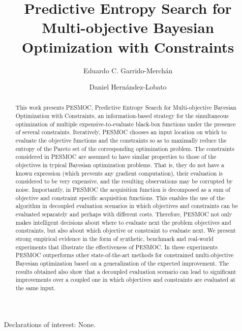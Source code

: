\documentclass[review,preprint,12pt]{elsarticle}
\begin{document}
\begin{frontmatter}

\title{Predictive Entropy Search for Multi-objective Bayesian Optimization with Constraints}

\author{Eduardo C. Garrido-Merch\'an}
\address{Computer Science Department\\
       Universidad Aut\'onoma de Madrid\\
       Francisco Tom\'as y Valiente 11, Madrid, Spain}
\author{Daniel Hern\'andez-Lobato}
\address{Computer Science Department\\
       Universidad Aut\'onoma de Madrid\\
       Francisco Tom\'as y Valiente 11, Madrid, Spain}

\maketitle

Declarations of interest: None.
\begin{abstract}%
This work presents PESMOC, Predictive Entropy
Search for Multi-objective Bayesian Optimization with Constraints,
an information-based strategy for the simultaneous optimization
of multiple expensive-to-evaluate black-box functions
under the presence of several constraints. Iteratively,
PESMOC chooses an input location on which to evaluate the
objective functions and the constraints so as to maximally reduce
the entropy of the Pareto set of the corresponding optimization
problem. The constraints considered in PESMOC are assumed
to have similar properties to those of the objectives in typical 
Bayesian optimization problems. That is, they do not have 
a known expression (which prevents any gradient computation), their 
evaluation is considered to be very expensive, and the resulting 
observations may be corrupted by noise. Importantly, in PESMOC 
the acquisition function is decomposed as a sum of 
objective and constraint specific acquisition functions.
This enables the use of the algorithm in decoupled evaluation 
scenarios in which objectives and constraints can be evaluated 
separately and perhaps with different costs. Therefore, PESMOC
not only makes intelligent decisions about where to evaluate 
next the problem objectives and constraints, but also about 
which objective or constraint to evaluate next. We present strong 
empirical evidence in the form of synthetic, benchmark and real-world
experiments that illustrate the effectiveness of PESMOC. In 
these experiments PESMOC outperforms other state-of-the-art methods for 
constrained multi-objective Bayesian optimization based on a generalization of the 
expected improvement. The results obtained also show that a decoupled 
evaluation scenario can lead to significant improvements over a coupled one 
in which objectives and constraints are evaluated at the same input.
\end{abstract}


\end{frontmatter}
\end{document}
